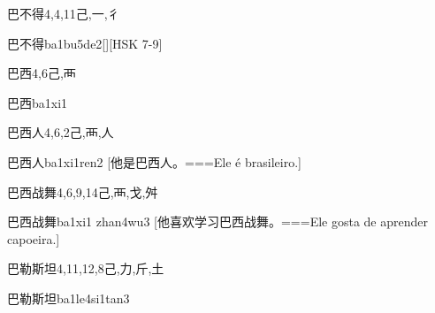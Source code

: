 \begin{Entry}{巴不得}{4,4,11}{⼰,⼀,⼻}
  \begin{Phonetics}{巴不得}{ba1bu5de2}[][HSK 7-9]
  \end{Phonetics}
\end{Entry}

\begin{Entry}{巴西}{4,6}{⼰,⾑}
  \begin{Phonetics}{巴西}{ba1xi1}
  \end{Phonetics}
\end{Entry}

\begin{Entry}{巴西人}{4,6,2}{⼰,⾑,⼈}
  \begin{Phonetics}{巴西人}{ba1xi1ren2}
    [他是巴西人。===Ele é brasileiro.]
  \end{Phonetics}
\end{Entry}

\begin{Entry}{巴西战舞}{4,6,9,14}{⼰,⾑,⼽,⾇}
  \begin{Phonetics}{巴西战舞}{ba1xi1 zhan4wu3}
    [他喜欢学习巴西战舞。===Ele gosta de aprender capoeira.]
  \end{Phonetics}
\end{Entry}

\begin{Entry}{巴勒斯坦}{4,11,12,8}{⼰,⼒,⽄,⼟}
  \begin{Phonetics}{巴勒斯坦}{ba1le4si1tan3}
  \end{Phonetics}
\end{Entry}


